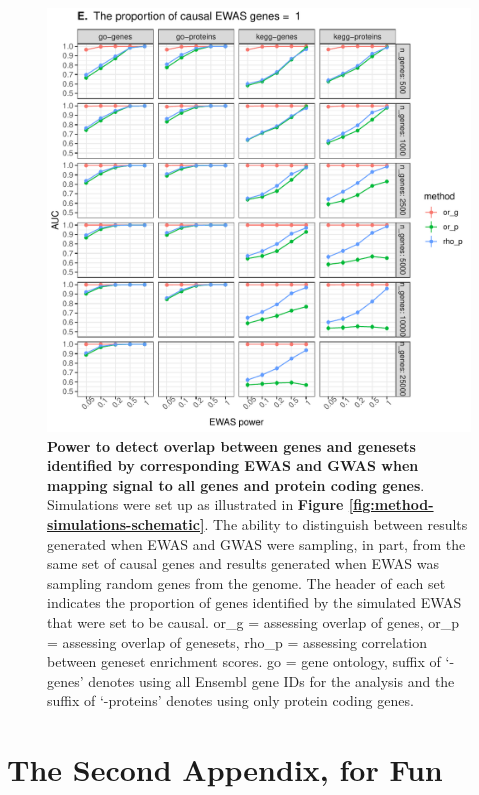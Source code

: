\documentclass[11pt,oneside]{bristolthesis}
\begin{document}
\begin{figure}

{\centering \includegraphics[width=1\linewidth]{figure/06-ewas_gwas_comparison/method_test_gene_v_protein/PEC_1} 

}

\caption[Power to detect overlap between genes and genesets identified by corresponding EWAS and GWAS when mapping signal to all genes and protein coding genes]{\textbf{Power to detect overlap between genes and genesets identified by corresponding EWAS and GWAS when mapping signal to all genes and protein coding genes}. Simulations were set up as illustrated in \textbf{Figure \ref{fig:method-simulations-schematic}}. The ability to distinguish between results generated when EWAS and GWAS were sampling, in part, from the same set of causal genes and results generated when EWAS was sampling random genes from the genome. The header of each set indicates the proportion of genes identified by the simulated EWAS that were set to be causal. or\_g = assessing overlap of genes, or\_p = assessing overlap of genesets, rho\_p = assessing correlation between geneset enrichment scores. go = gene ontology, suffix of `-genes' denotes using all Ensembl gene IDs for the analysis and the suffix of `-proteins' denotes using only protein coding genes.}\label{fig:sim1-go-kegg-gene-comp5}
\end{figure}
\hypertarget{the-second-appendix-for-fun}{%
\chapter{The Second Appendix, for Fun}\label{the-second-appendix-for-fun}}
\end{document}
